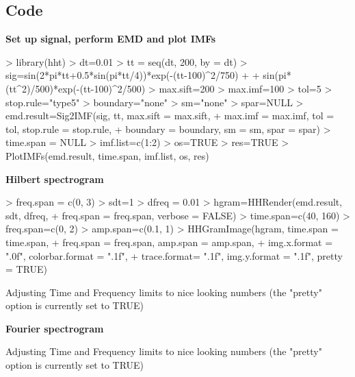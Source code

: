 \documentclass[12pt]{article}
\begin{document}
\subsection{Code}

\textbf{Set up signal, perform EMD and plot IMFs}
\begin{Schunk}
\begin{Sinput}
> library(hht)
> dt=0.01
> tt = seq(dt, 200, by = dt)
> sig=sin(2*pi*tt+0.5*sin(pi*tt/4))*exp(-(tt-100)^2/750) + 
+     sin(pi*(tt^2)/500)*exp(-(tt-100)^2/500)
> max.sift=200
> max.imf=100
> tol=5
> stop.rule="type5"
> boundary="none"
> sm="none"
> spar=NULL
> emd.result=Sig2IMF(sig, tt, max.sift = max.sift,
+     max.imf = max.imf, tol = tol, stop.rule = stop.rule,
+     boundary = boundary, sm = sm, spar = spar)
> time.span = NULL
> imf.list=c(1:2)
> os=TRUE
> res=TRUE
> PlotIMFs(emd.result, time.span, imf.list, os, res)
\end{Sinput}
\end{Schunk}

\textbf{Hilbert spectrogram}

\begin{Schunk}
\begin{Sinput}
> freq.span = c(0, 3)
> sdt=1
> dfreq = 0.01
> hgram=HHRender(emd.result, sdt, dfreq, 
+     freq.span = freq.span, verbose = FALSE)
> time.span=c(40, 160)
> freq.span=c(0, 2)
> amp.span=c(0.1, 1)
> HHGramImage(hgram, time.span = time.span, 
+     freq.span = freq.span, amp.span = amp.span,
+     img.x.format = ".0f", colorbar.format = ".1f", 
+     trace.format= ".1f", img.y.format = ".1f", pretty = TRUE)
\end{Sinput}
\begin{Soutput}
Adjusting Time and Frequency limits to nice looking numbers (the "pretty" option is currently set to TRUE)
\end{Soutput}
\end{Schunk}

\textbf{Fourier spectrogram}
\begin{Schunk}
\begin{Soutput}
Adjusting Time and Frequency limits to nice looking numbers (the "pretty" option is currently set to TRUE)
\end{Soutput}
\end{Schunk}
\end{document}
